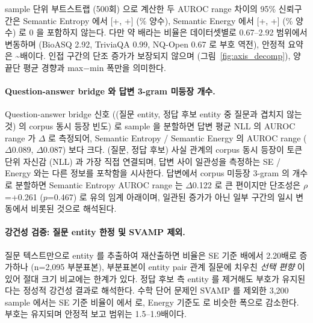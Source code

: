 \documentclass[oneside,ko,under]{snuthesis}
\begin{document}
sample 단위 부트스트랩 (500회) 으로 계산한 두 AUROC range 차이의 95\% 신뢰구간은 Semantic Entropy 에서 [+\HeadlinePairMinusFreqSECIlow{}, +\HeadlinePairMinusFreqSECIhigh{}] (\HeadlinePairMinusFreqSEPositiveFrac{}\% 양수), Semantic Energy 에서 [+\HeadlinePairMinusFreqEnergyCIlow{}, +\HeadlinePairMinusFreqEnergyCIhigh{}] (\HeadlinePairMinusFreqEnergyPositiveFrac{}\% 양수) 로 0 을 포함하지 않는다. 다만 약 \HeadlineEntityPairOverEntityFreqRatio{}배라는 비율은 데이터셋별로 0.67--2.92 범위에서 변동하며 (BioASQ 2.92, TriviaQA 0.99, NQ-Open 0.67 로 부호 역전), 안정적 요약은 \HeadlineRatioRangeLow{}\textasciitilde{}\HeadlineRatioRangeHigh{}배이다. 인접 구간의 단조 증가가 보장되지 않으며 (그림~\ref{fig:axis_decomp}), 양 끝단 평균 경향과 max$-$min 폭만을 의미한다.

\paragraph{Question-answer bridge 와 답변 3-gram 미등장 개수.}
Question-answer bridge 신호 ((질문 entity, 정답 후보 entity 중 질문과 겹치지 않는 것) 의 corpus 동시 등장 빈도) 로 sample 을 분할하면 답변 평균 NLL 의 AUROC range 가 $\Delta$\HeadlineQaBridgeNllDelta{} 로 측정되어, Semantic Entropy / Semantic Energy 의 AUROC range ($\Delta$0.089, $\Delta$0.087) 보다 크다. (질문, 정답 후보) 사실 관계의 corpus 동시 등장이 토큰 단위 자신감 (NLL) 과 가장 직접 연결되며, 답변 사이 일관성을 측정하는 SE / Energy 와는 다른 정보를 포착함을 시사한다. 답변에서 corpus 미등장 3-gram 의 개수로 분할하면 Semantic Entropy AUROC range 는 $\Delta$0.122 로 큰 편이지만 단조성은 $\rho$=+0.261 ($p$=0.467) 로 유의 임계 아래이며, 일관된 증가가 아닌 일부 구간의 일시 변동에서 비롯된 것으로 해석된다.

\paragraph{강건성 검증: 질문 entity 한정 및 SVAMP 제외.}
질문 텍스트만으로 entity 를 추출하여 재산출하면 비율은 SE 기준 \HeadlineEntityPairOverEntityFreqRatio{}배에서 2.20배로 증가하나 (n=2{,}095 부분표본), 부분표본이 entity pair 관계 질문에 치우친 \emph{선택 편향} 이 있어 절대 크기 비교에는 한계가 있다. 정답 후보 측 entity 를 제거해도 부호가 유지된다는 정성적 강건성 결과로 해석한다. 수학 단어 문제인 SVAMP 를 제외한 3{,}200 sample 에서는 SE 기준 비율이 \HeadlineEntityPairOverEntityFreqRatio{} 에서 \HeadlineSVAMPExclSERatio{} 로, Energy 기준도 \HeadlineSVAMPExclEnergyRatio{} 로 비슷한 폭으로 감소한다. 부호는 유지되며 안정적 보고 범위는 1.5--1.9배이다.
\end{document}
